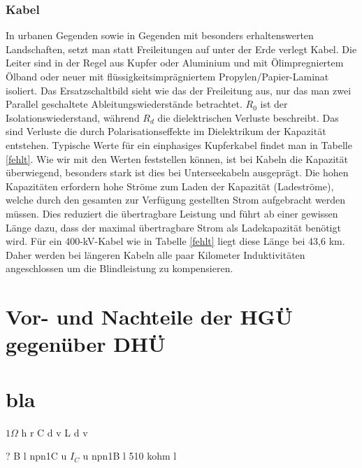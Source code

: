 \documentclass[10pt,a4paper]{article}
\begin{document}
\subsubsection{Kabel}
In urbanen Gegenden sowie in Gegenden mit besonders erhaltenswerten Landschaften, setzt man statt Freileitungen auf unter der Erde verlegt Kabel. Die Leiter sind in der Regel aus Kupfer oder Aluminium und mit Ölimpregniertem Ölband oder neuer mit flüssigkeitsimprägniertem Propylen/Papier-Laminat isoliert. 
Das Ersatzschaltbild sieht wie das der Freileitung aus, nur das man zwei Parallel geschaltete Ableitungswiederstände betrachtet.
$R_0$ ist der Isolationswiederstand, während $R_d$ die dielektrischen Verluste beschreibt. Das sind Verluste die durch Polarisationseffekte im Dielektrikum der Kapazität entstehen.
Typische Werte für ein einphasiges Kupferkabel findet man in Tabelle \ref{fehlt}.
Wie wir mit den Werten feststellen können, ist bei Kabeln die Kapazität überwiegend,
besonders stark ist dies bei Unterseekabeln ausgeprägt. %
Die hohen Kapazitäten erfordern hohe Ströme zum Laden der Kapazität (Ladeströme), welche durch den gesamten zur Verfügung gestellten Strom aufgebracht werden müssen. Dies reduziert die übertragbare Leistung und führt ab einer gewissen Länge dazu, dass der maximal übertragbare Strom als Ladekapazität benötigt wird. %
Für ein 400-kV-Kabel wie in Tabelle \ref{fehlt} liegt diese Länge bei 43,6 km.
Daher werden bei längeren Kabeln alle paar Kilometer %
Induktivitäten angeschlossen um die Blindleistung zu kompensieren.

\section{Vor- und Nachteile der HGÜ gegenüber DHÜ}

\section*{bla}
\begin{circuit}{2}
 {$1 \Omega$} h
 r
 C d
 v
\nl{} {L} d 
\nl{} v
\end{circuit}

\begin{circuit}{0}
 {?} B l
\frompin npn1C
 u
\nl{} {$I_C$} u
\atpin npn1B
 l
 {510 kohm} l
\end{circuit}


{}

\end{document}
